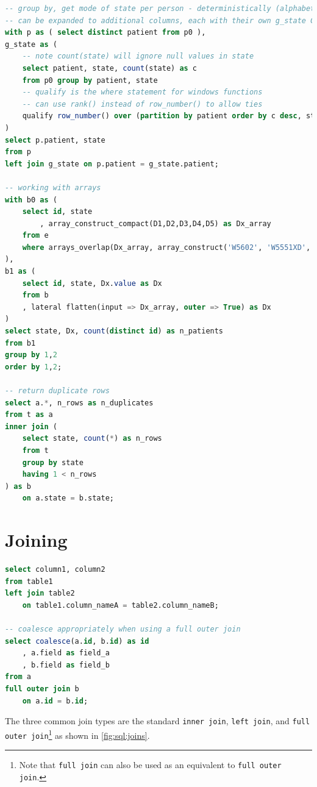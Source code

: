 \begin{lstlisting}[language=SQL]
-- group by, get mode of state per person - deterministically (alphabetical order)
-- can be expanded to additional columns, each with their own g_state CTEs
with p as ( select distinct patient from p0 ),
g_state as (
	-- note count(state) will ignore null values in state
	select patient, state, count(state) as c
	from p0 group by patient, state
	-- qualify is the where statement for windows functions
	-- can use rank() instead of row_number() to allow ties
	qualify row_number() over (partition by patient order by c desc, state asc) = 1
)
select p.patient, state
from p
left join g_state on p.patient = g_state.patient;

-- working with arrays
with b0 as (
	select id, state
		, array_construct_compact(D1,D2,D3,D4,D5) as Dx_array
	from e
	where arrays_overlap(Dx_array, array_construct('W5602', 'W5551XD', 'W5803XA'))
),
b1 as (
	select id, state, Dx.value as Dx
	from b
	, lateral flatten(input => Dx_array, outer => True) as Dx
)
select state, Dx, count(distinct id) as n_patients
from b1
group by 1,2
order by 1,2;

-- return duplicate rows
select a.*, n_rows as n_duplicates
from t as a
inner join (
	select state, count(*) as n_rows
	from t
	group by state
	having 1 < n_rows
) as b
	on a.state = b.state;
\end{lstlisting}

\section{Joining}
\label{sql:join}

\begin{lstlisting}[language=SQL]
select column1, column2
from table1
left join table2
	on table1.column_nameA = table2.column_nameB;

-- coalesce appropriately when using a full outer join
select coalesce(a.id, b.id) as id
	, a.field as field_a
	, b.field as field_b
from a
full outer join b
	on a.id = b.id;
\end{lstlisting}

The three common join types are the standard
\texttt{inner join}, \texttt{left join},
and \texttt{full outer join}\footnote{Note that \texttt{full join} can also be used as an equivalent to \texttt{full outer join}.} as
shown in \cref{fig:sql:joins}.

